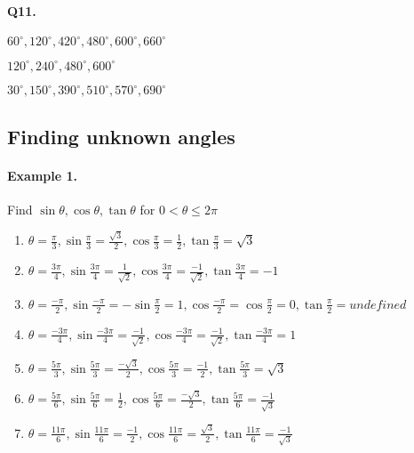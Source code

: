 \documentclass{article}
\begin{document}
\paragraph{Q11.}
\begin{enumerate*}[label=\alph*)]
          \item $60^{\circ}, 120^{\circ}, 420^{\circ}, 480^{\circ}, 600^{\circ}, 660^{\circ}$
          \item $120^{\circ}, 240^{\circ}, 480^{\circ}, 600^{\circ}$
          \item $30^{\circ}, 150^{\circ}, 390^{\circ}, 510^{\circ}, 570^{\circ}, 690^{\circ}$
\end{enumerate*}

\subsection {Finding unknown angles}
\paragraph{Example 1.}
Find $\sin\theta, \cos\theta, \tan\theta$ for $0<\theta\leq2\pi$

\begin{enumerate}[label=\alph*)]
  \item $\theta = \frac{\pi}{3}, \sin\frac{\pi}{3}=\frac{\sqrt{3}}{2}, \cos\frac{\pi}{3}=\frac{1}{2}, \tan\frac{\pi}{3}=\sqrt{3}$
  \item $\theta = \frac{3\pi}{4}, \sin\frac{3\pi}{4}=\frac{1}{\sqrt{2}}, \cos\frac{3\pi}{4}=\frac{-1}{\sqrt{2}}, \tan\frac{3\pi}{4}=-1$
  \item $\theta = \frac{-\pi}{2}, \sin\frac{-\pi}{2}=-\sin\frac{\pi}{2}=1, \cos\frac{-\pi}{2}=\cos\frac{\pi}{2}=0, \tan\frac{\pi}{2}=undefined$
  \item $\theta = \frac{-3\pi}{4}, \sin\frac{-3\pi}{4}=\frac{-1}{\sqrt{2}}, \cos\frac{-3\pi}{4}=\frac{-1}{\sqrt{2}}, \tan\frac{-3\pi}{4}=1$
  \item $\theta = \frac{5\pi}{3}, \sin\frac{5\pi}{3}=\frac{-\sqrt{3}}{2}, \cos\frac{5\pi}{3}=\frac{-1}{2}, \tan\frac{5\pi}{3}=\sqrt{3}$
  \item $\theta = \frac{5\pi}{6}, \sin\frac{5\pi}{6}=\frac{1}{2}, \cos\frac{5\pi}{6}=\frac{-\sqrt{3}}{2}, \tan\frac{5\pi}{6}=\frac{-1}{\sqrt{3}}$
  \item $\theta = \frac{11\pi}{6}, \sin\frac{11\pi}{6}=\frac{-1}{2}, \cos\frac{11\pi}{6}=\frac{\sqrt{3}}{2}, \tan\frac{11\pi}{6}=\frac{-1}{\sqrt{3}}$
\end{enumerate}
\end{document}
